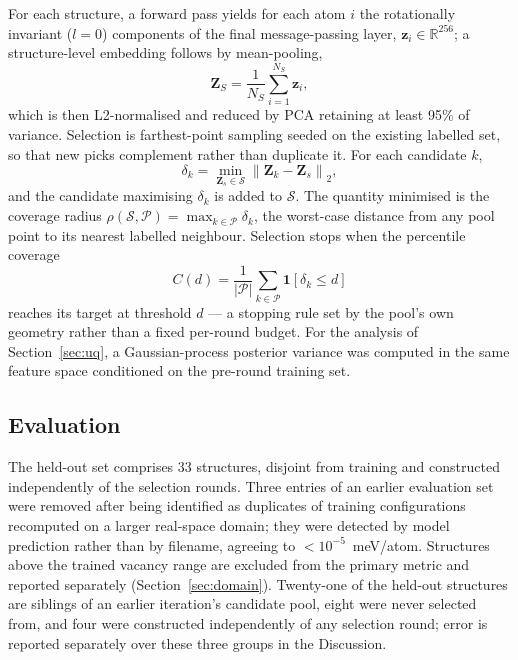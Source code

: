 \documentclass[11pt]{article}
\begin{document}
For each structure, a forward pass yields for each atom $i$ the rotationally
invariant ($l=0$) components of the final message-passing layer,
$\mathbf{z}_i\in\mathbb{R}^{256}$; a structure-level embedding follows by
mean-pooling,
\begin{equation}
\mathbf{Z}_S = \frac{1}{N_S}\sum_{i=1}^{N_S}\mathbf{z}_i ,
\end{equation}
which is then L2-normalised and reduced by PCA retaining at least 95\% of
variance. Selection is farthest-point sampling seeded on the existing labelled
set, so that new picks complement rather than duplicate it. For each candidate
$k$,
\begin{equation}
\delta_k = \min_{\mathbf{Z}_s\in\mathcal{S}}\left\|\mathbf{Z}_k-\mathbf{Z}_s\right\|_2 ,
\end{equation}
and the candidate maximising $\delta_k$ is added to $\mathcal{S}$. The quantity
minimised is the coverage radius
$\rho(\mathcal{S},\mathcal{P}) = \max_{k\in\mathcal{P}}\delta_k$, the
worst-case distance from any pool point to its nearest labelled neighbour.
Selection stops when the percentile coverage
\begin{equation}
C(d) = \frac{1}{|\mathcal{P}|}\sum_{k\in\mathcal{P}}
\mathbf{1}\!\left[\delta_k\leq d\right]
\end{equation}
reaches its target at threshold $d$ --- a stopping rule set by the pool's own
geometry rather than a fixed per-round budget. For the analysis of
Section~\ref{sec:uq}, a Gaussian-process posterior variance was computed in the
same feature space conditioned on the pre-round training set.

\subsection{Evaluation}
The held-out set comprises 33 structures, disjoint from training and
constructed independently of the selection rounds. Three entries of an earlier
evaluation set were removed after being identified as duplicates of training
configurations recomputed on a larger real-space domain; they were detected by
model prediction rather than by filename, agreeing to
$<10^{-5}$~meV/atom. Structures above the trained vacancy range are excluded
from the primary metric and reported separately (Section~\ref{sec:domain}).
Twenty-one of the held-out structures are siblings of an earlier iteration's
candidate pool, eight were never selected from, and four were constructed
independently of any selection round; error is reported separately over these
three groups in the Discussion.
\end{document}
